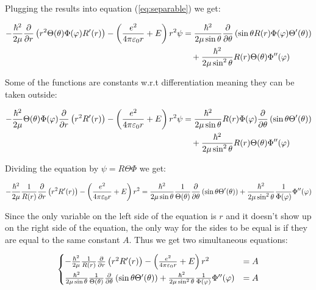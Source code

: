 \documentclass{article}
\begin{document}
    Plugging the results into equation (\ref{eq:separable}) we get:
    
    \begin{equation}
        \begin{aligned}
            -\frac{\hbar^2}{2\mu}\pdv{}{r}\left( r^2\Theta(\theta)\Phi(\varphi)R'(r) \right) - \left( \frac{e^{2}}{4\pi\varepsilon_{0}r} + E \right)r^2\psi
            &= \frac{\hbar^2}{2\mu\sin\theta}\pdv{}{\theta}\left( \sin\theta R(r)\Phi(\varphi)\Theta'(\theta) \right) \\
            &\quad + \frac{\hbar^2}{2\mu\sin^2\theta}R(r)\Theta(\theta)\Phi''(\varphi)
        \end{aligned}
    \end{equation}    
    
    Some of the functions are constants w.r.t differentiation meaning they can be taken outside:

    \begin{equation}
        \begin{aligned}
            -\frac{\hbar^2}{2\mu}\Theta(\theta)\Phi(\varphi)\pdv{}{r}\left( r^2R'(r) \right) - \left( \frac{e^{2}}{4\pi\varepsilon_{0}r} + E \right)r^2\psi
            &= \frac{\hbar^2}{2\mu\sin\theta}R(r)\Phi(\varphi)\pdv{}{\theta}\left( \sin\theta \Theta'(\theta) \right) \\
            &\quad + \frac{\hbar^2}{2\mu\sin^2\theta}R(r)\Theta(\theta)\Phi''(\varphi)
        \end{aligned}
    \end{equation}    

    Dividing the equation by $\psi = R\Theta\Phi$ we get:

    \begin{equation}
        -\frac{\hbar^2}{2\mu}\frac{1}{R(r)}\pdv{}{r}\left( r^2R'(r) \right) - \left( \frac{e^{2}}{4\pi\varepsilon_{0}r} + E \right)r^2 = \frac{\hbar^2}{2\mu\sin\theta}\frac{1}{\Theta(\theta)}\pdv{}{\theta}\left( \sin\theta \Theta'(\theta) \right)
        + \frac{\hbar^2}{2\mu\sin^2\theta}\frac{1}{\Phi(\varphi)}\Phi''(\varphi)
    \end{equation}    

    Since the only variable on the left side of the equation is $r$ and it doesn't show up on the right side of the equation, the only way for the sides to be equal is if they are equal to the same constant $A$. Thus
    we get two simultaneous equations:

    \begin{equation}
        \begin{cases}
            -\frac{\hbar^2}{2\mu}\frac{1}{R(r)}\pdv{}{r}\left( r^2R'(r) \right) - \left( \frac{e^{2}}{4\pi\varepsilon_{0}r} + E \right)r^2 &= A \\[0.5em]   
            \frac{\hbar^2}{2\mu\sin\theta}\frac{1}{\Theta(\theta)}\pdv{}{\theta}\left( \sin\theta \Theta'(\theta) \right) + \frac{\hbar^2}{2\mu\sin^2\theta}\frac{1}{\Phi(\varphi)}\Phi''(\varphi) &= A
        \end{cases}
    \end{equation}
\end{document}

